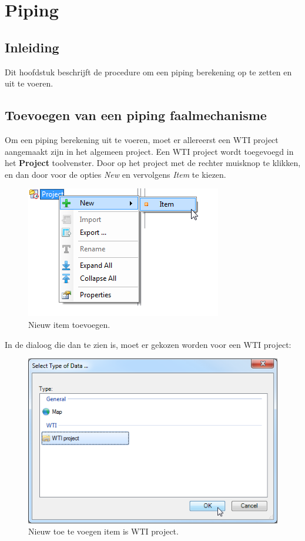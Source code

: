 
\chapter{Piping\label{chap:piping}}

\section{Inleiding}
Dit hoofdstuk beschrijft de procedure om een piping berekening op te zetten en uit te voeren. 

\section{Toevoegen van een piping faalmechanisme}
\label{sec:addpiping}
Om een piping berekening uit te voeren, moet er allereerst een WTI project aangemaakt zijn in het algemeen project. Een WTI project wordt toegevoegd in het \textbf{Project} toolvenster. Door op het project met de rechter muisknop te klikken, en dan door voor de opties \textit{New} en vervolgens \textit{Item} te kiezen.

\begin{figure} [H]
	\centering
		\includegraphics{figures/chapter_piping/addNewProject}
	\caption{Nieuw item toevoegen.}
	\label{fig:fig5.1}
\end{figure}

In de dialoog die dan te zien is, moet er gekozen worden voor een WTI project:

\begin{figure} [H]
	\centering
		\includegraphics{figures/chapter_piping/selectWTIProject}
	\caption{Nieuw toe te voegen item is WTI project.}
	\label{fig:fig5.2}
\end{figure}

